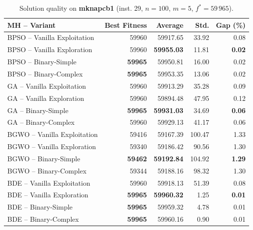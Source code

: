 \documentclass[journal,article,submit,moreauthors]{Definitions/mdpi}
\begin{document}
\begin{table}[htbp]
  \centering
  \small
  \caption{Solution quality on \textbf{mknapcb1} (inst. 29, $n=100$, $m=5$, $f^*=59\,965$).}
  \label{tab:calidad_mknapcb1_29}
  \begin{tabular}{lrrrr}
    \toprule
    \textbf{MH -- Variant} &
    \textbf{Best Fitness} &
    \textbf{Average} &
    \textbf{Std.} &
    \textbf{Gap (\%)} \\
    \midrule
    BPSO -- Vanilla Exploitation &          59960 &         59917.65 &  33.92 &         0.08 \\
    BPSO -- Vanilla Exploration  &          59960 & \textbf{59955.03} &  11.81 & \textbf{0.02} \\
    BPSO -- Binary-Simple        & \textbf{59965} &         59950.81 &  16.00 &         0.02 \\
    BPSO -- Binary-Complex       & \textbf{59965} &         59953.35 &  13.06 &         0.02 \\
    \midrule
    GA -- Vanilla Exploitation   &          59960 &         59913.29 &  35.28 &         0.09 \\
    GA -- Vanilla Exploration    &          59960 &         59894.48 &  47.95 &         0.12 \\
    GA -- Binary-Simple          & \textbf{59965} & \textbf{59931.03} &  34.69 & \textbf{0.06} \\
    GA -- Binary-Complex         &          59960 &         59929.13 &  41.17 &         0.06 \\
    \midrule
    BGWO -- Vanilla Exploitation &          59416 &         59167.39 & 100.47 &         1.33 \\
    BGWO -- Vanilla Exploration  &          59340 &         59186.42 &  90.56 &         1.30 \\
    BGWO -- Binary-Simple        & \textbf{59462} & \textbf{59192.84} & 104.92 & \textbf{1.29} \\
    BGWO -- Binary-Complex       &          59344 &         59188.16 &  98.32 &         1.30 \\
    \midrule
    BDE -- Vanilla Exploitation  &          59960 &         59918.13 &  51.39 &         0.08 \\
    BDE -- Vanilla Exploration   & \textbf{59965} & \textbf{59960.32} &   1.25 & \textbf{0.01} \\
    BDE -- Binary-Simple         & \textbf{59965} &         59959.32 &   4.78 &         0.01 \\
    BDE -- Binary-Complex        & \textbf{59965} &         59960.16 &   0.90 &         0.01 \\
    \bottomrule
  \end{tabular}
\end{table}
\end{document}
